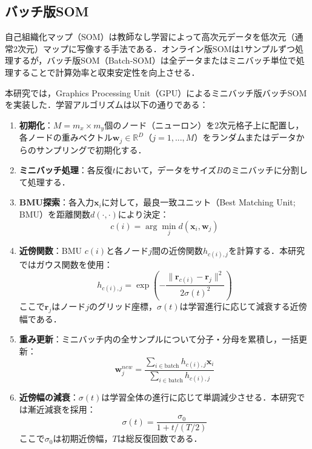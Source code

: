 \documentclass{jarticle}
\theoremstyle{definition}
\begin{document}
\subsection{バッチ版SOM}
自己組織化マップ（SOM）\cite{kohonen1990self}は教師なし学習によって高次元データを低次元（通常2次元）マップに写像する手法である．オンライン版SOMは1サンプルずつ処理するが，バッチ版SOM（Batch-SOM）は全データまたはミニバッチ単位で処理することで計算効率と収束安定性を向上させる．

本研究では，Graphics Processing Unit（GPU）によるミニバッチ版バッチSOMを実装した\cite{vettigliminisom}．学習アルゴリズムは以下の通りである：

\begin{enumerate}
\item \textbf{初期化}：$M = m_x \times m_y$個のノード（ニューロン）を2次元格子上に配置し，各ノードの重みベクトル$\bm{w}_j \in \mathbb{R}^D$（$j=1,...,M$）をランダムまたはデータからのサンプリングで初期化する．
\item \textbf{ミニバッチ処理}：各反復$t$において，データをサイズ$B$のミニバッチに分割して処理する．
\item \textbf{BMU探索}：各入力$\bm{x}_i$に対して，最良一致ユニット（Best Matching Unit; BMU）を距離関数$d(\cdot, \cdot)$により決定：
\begin{equation}
c(i) = \arg\min_{j} d(\bm{x}_i, \bm{w}_j)
\end{equation}
\item \textbf{近傍関数}：BMU $c(i)$と各ノード$j$間の近傍関数$h_{c(i),j}$を計算する．本研究ではガウス関数を使用：
\begin{equation}
h_{c(i),j} = \exp\left(-\frac{\|\bm{r}_{c(i)} - \bm{r}_j\|^2}{2\sigma(t)^2}\right)
\end{equation}
ここで$\bm{r}_j$はノード$j$のグリッド座標，$\sigma(t)$は学習進行に応じて減衰する近傍幅である．
\item \textbf{重み更新}：ミニバッチ内の全サンプルについて分子・分母を累積し，一括更新：
\begin{equation}
\bm{w}_j^{new} = \frac{\sum_{i \in \text{batch}} h_{c(i),j} \bm{x}_i}{\sum_{i \in \text{batch}} h_{c(i),j}}
\end{equation}
\item \textbf{近傍幅の減衰}：$\sigma(t)$は学習全体の進行に応じて単調減少させる．本研究では漸近減衰を採用：
\begin{equation}
\sigma(t) = \frac{\sigma_0}{1 + t/(T/2)}
\end{equation}
ここで$\sigma_0$は初期近傍幅，$T$は総反復回数である．
\end{enumerate}
\end{document}
